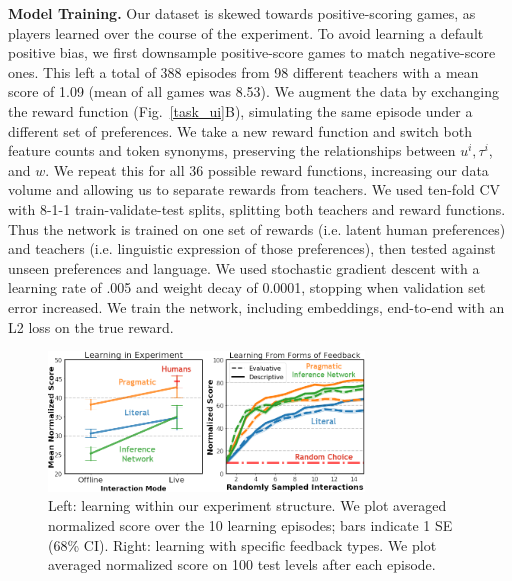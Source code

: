 \documentclass[letterpaper]{article} %
\begin{document}
\textbf{Model Training.} Our dataset is skewed towards positive-scoring games, as players learned over the course of the experiment. To avoid learning a default positive bias, we first downsample positive-score games to match negative-score ones. This left a total of 388 episodes from 98 different teachers with a mean score of 1.09 (mean of all games was 8.53). We augment the data by exchanging the reward function (Fig.~\ref{task_ui}B), simulating the same episode under a different set of preferences. We take a new reward function and switch both feature counts and token synonyms, preserving the relationships between $u^i, \tau^i$, and $w$. We repeat this for all 36 possible reward functions, increasing our data volume and allowing us to separate rewards from teachers. We used ten-fold CV with 8-1-1 train-validate-test splits, splitting both teachers and reward functions. Thus the network is trained on one set of rewards (i.e. latent human preferences) and teachers (i.e. linguistic expression of those preferences), then tested against unseen preferences and language. We used stochastic gradient descent with a learning rate of .005 and weight decay of 0.0001, stopping when validation set error increased. We train the network, including embeddings, end-to-end with an L2 loss on the true reward.   

\begin{figure}[t]
\begin{center}
\includegraphics[width=8.4cm]{images/results_aaai.png}
\end{center}
\caption{Left: learning within our experiment structure. We plot averaged normalized score over the 10 learning episodes; bars indicate 1 SE (68\% CI). Right: learning with specific feedback types. We plot averaged normalized score on 100 test levels after each episode.}
\label{model_results_figure}
\end{figure}
\end{document}

